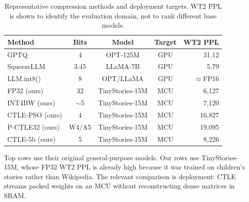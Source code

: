 %
%

\begin{table}[t]
\centering
\footnotesize
\caption{Representative compression methods and deployment targets. WT2 PPL is
shown to identify the evaluation domain, not to rank different base models.}
\label{tab:sota}
\setlength{\tabcolsep}{3pt}
\renewcommand{\arraystretch}{1.2}
\begin{tabular}{lcccr}
\toprule
\textbf{Method} & \textbf{Bits} & \textbf{Model} &
\textbf{Target} & \textbf{WT2 PPL} \\
\midrule
GPTQ~\cite{frantar2023gptq} & 4 & OPT-125M & GPU & 31.12 \\
SqueezeLLM~\cite{kim2024squeezellm} & 3.45 & LLaMA-7B & GPU & 5.79 \\
LLM.int8()~\cite{dettmers2022llmint8} & 8 & OPT/LLaMA & GPU & $\approx$FP16 \\
\midrule
FP32 (ours) & 32 & TinyStories-15M & MCU & 6{,}127 \\
INT4BW (ours) & $\sim$5 & TinyStories-15M & MCU & 7{,}120 \\
CTLE-PSO (ours) & 4 & TinyStories-15M & MCU & 16{,}827 \\
P-CTLE32 (ours) & W4/A5 & TinyStories-15M & MCU & 19{,}095 \\
CTLE-5b (ours) & 5 & TinyStories-15M & MCU & 8{,}226 \\
\bottomrule
\end{tabular}
\smallskip
\begin{minipage}{0.98\columnwidth}
  \footnotesize
  Top rows use their original general-purpose models. Our rows use
  TinyStories-15M, whose FP32 WT2 PPL is already high because it was trained
  on children's stories rather than Wikipedia. The relevant comparison is
  deployment: CTLE streams packed weights on an MCU without reconstructing
  dense matrices in SRAM.
\end{minipage}
\end{table}
